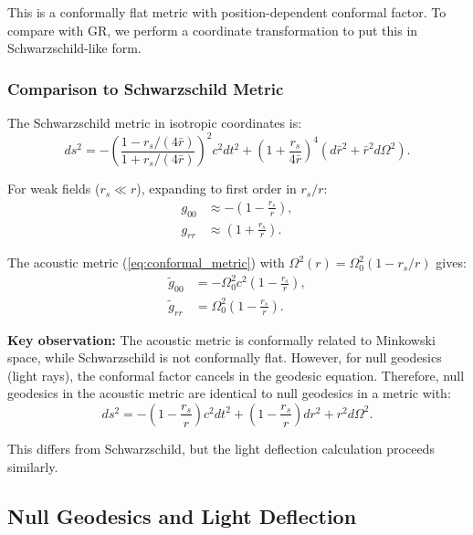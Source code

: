 \documentclass[11pt,a4paper]{article}
\theoremstyle{definition}
\theoremstyle{remark}
\begin{document}
This is a conformally flat metric with position-dependent conformal factor. To compare with GR, we perform a coordinate transformation to put this in Schwarzschild-like form.

\subsubsection{Comparison to Schwarzschild Metric}

The Schwarzschild metric in isotropic coordinates is:
\begin{equation}
\label{eq:schwarzschild_isotropic}
ds^2 = -\left(\frac{1 - r_s/(4\bar{r})}{1 + r_s/(4\bar{r})}\right)^2 c^2 dt^2 + \left(1 + \frac{r_s}{4\bar{r}}\right)^4 (d\bar{r}^2 + \bar{r}^2 d\Omega^2).
\end{equation}

For weak fields ($r_s \ll r$), expanding to first order in $r_s/r$:
\begin{align}
g_{00} &\approx -\left(1 - \frac{r_s}{r}\right), \\
g_{rr} &\approx \left(1 + \frac{r_s}{r}\right).
\end{align}

The acoustic metric (\ref{eq:conformal_metric}) with $\Omega^2(r) = \Omega_0^2(1 - r_s/r)$ gives:
\begin{align}
\tilde{g}_{00} &= -\Omega_0^2 c^2 \left(1 - \frac{r_s}{r}\right), \\
\tilde{g}_{rr} &= \Omega_0^2 \left(1 - \frac{r_s}{r}\right).
\end{align}

\textbf{Key observation:} The acoustic metric is conformally related to Minkowski space, while Schwarzschild is not conformally flat. However, for null geodesics (light rays), the conformal factor cancels in the geodesic equation. Therefore, null geodesics in the acoustic metric are identical to null geodesics in a metric with:
\begin{equation}
ds^2 = -\left(1 - \frac{r_s}{r}\right) c^2 dt^2 + \left(1 - \frac{r_s}{r}\right) dr^2 + r^2 d\Omega^2.
\end{equation}

This differs from Schwarzschild, but the light deflection calculation proceeds similarly.

\subsection{Null Geodesics and Light Deflection}
\label{sec:null_geodesics}
\end{document}

